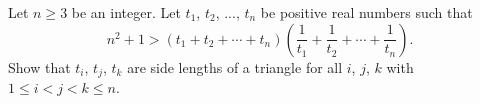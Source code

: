 Let $n \geq 3$ be an integer. Let $t_1$,  $t_2$,  ..., $t_n$ be positive real numbers such that \[n^2 + 1 > \left( t_1 + t_2 + \cdots + t_n \right) \left( \frac{1}{t_1} + \frac{1}{t_2} + \cdots + \frac{1}{t_n} \right).\] Show that $t_i$,  $t_j$,  $t_k$ are side lengths of a triangle for all $i$,  $j$,  $k$ with $1 \leq i < j < k \leq n$.